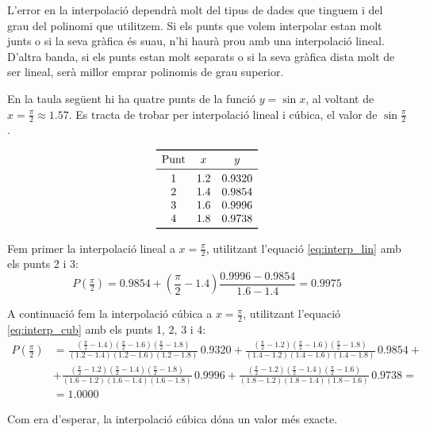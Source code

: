 L'error en la interpolació dependrà molt del tipus de dades que tinguem i del grau del polinomi que utilitzem. Si els punts que volem interpolar estan molt junts o si la seva gràfica és suau, n'hi haurà prou amb una interpolació lineal. D'altra banda, si els punts estan molt separats o si la seva gràfica dista molt de ser lineal, serà millor emprar polinomis de grau superior.


\begin{exemple}
    En la taula següent hi ha quatre punts de la funció $y = \sin x$, al voltant de $x=\frac{\pi}{2}\approx\num{1,57}$. Es tracta de trobar per interpolació lineal i cúbica, el valor de $\sin \frac{\pi}{2}$.
    \vspace{-8mm}
    \begin{center}
        \[\begin{array}{ccc}
           \toprule[1pt]
              \text{Punt} & x  & y \\
           \midrule
              1 & \num{1,2} & \num{0,9320} \\
              2 & \num{1,4} & \num{0,9854} \\
              3 & \num{1,6} & \num{0,9996} \\
              4 & \num{1,8} & \num{0,9738} \\
           \bottomrule[1pt]
        \end{array} \]
    \end{center}

    Fem primer la interpolació lineal a $x= \frac{\pi}{2}$, utilitzant l'equació \eqref{eq:interp_lin} amb els punts 2 i 3:
    \[ P\left(\tfrac{\pi}{2}\right) = \num{0,9854}+\left(\frac{\pi}{2}-\num{1,4}\right)\frac{\num{0,9996}-\num{0,9854}}{\num{1,6}-\num{1,4}}=
    \num{0,9975} \]

    A continuació fem la interpolació cúbica a $x= \frac{\pi}{2}$, utilitzant l'equació \eqref{eq:interp_cub} amb els punts 1, 2, 3 i 4:
    \[\begin{split}
      P\left(\tfrac{\pi}{2}\right) &= \frac{(\tfrac{\pi}{2}-\num{1,4})(\tfrac{\pi}{2}-\num{1,6})(\tfrac{\pi}{2}-\num{1,8})}{(\num{1,2}-\num{1,4})(\num{1,2}-\num{1,6})(\num{1,2}-\num{1,8})}\, \num{0,9320} +
              \frac{(\tfrac{\pi}{2}-\num{1,2})(\tfrac{\pi}{2}-\num{1,6})(\tfrac{\pi}{2}-\num{1,8})}{(\num{1,4}-\num{1,2})(\num{1,4}-\num{1,6})(\num{1,4}-\num{1,8})}\, \num{0,9854} + {} \\[1.5ex]
           &+ \frac{(\tfrac{\pi}{2}-\num{1,2})(\tfrac{\pi}{2}-\num{1,4})(\tfrac{\pi}{2}-\num{1,8})}{(\num{1,6}-\num{1,2})(\num{1,6}-\num{1,4})(\num{1,6}-\num{1,8})}\, \num{0,9996}+
              \frac{(\tfrac{\pi}{2}-\num{1,2})(\tfrac{\pi}{2}-\num{1,4})(\tfrac{\pi}{2}-\num{1,6})}{(\num{1,8}-\num{1,2})(\num{1,8}-\num{1,4})(\num{1,8}-\num{1,6})}\, \num{0,9738} = {} \\[1.5ex]
           &= \num{1,0000}
    \end{split}\]


    Com era d'esperar, la interpolació cúbica dóna un valor més exacte.
\end{exemple}


